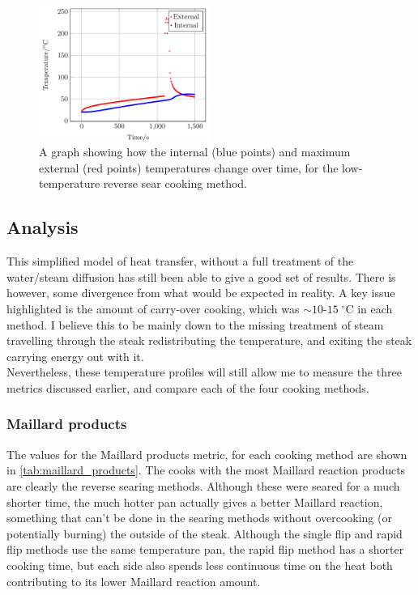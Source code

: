 \documentclass[11pt]{article}
\begin{document}
	\begin{figure}[H]
		\centering
		\includegraphics[width=0.5\textwidth]{./img/temps-low-reverse.png}
		\caption{A graph showing how the internal (blue points) and maximum external (red points) temperatures change over time, for the low-temperature reverse sear cooking method.}
		\label{fig:low-reverse-sear-temps}
	\end{figure}
	
	\subsection{Analysis}
	
	This simplified model of heat transfer, without a full treatment of the water/steam diffusion has still been able to give a good set of results. There is however, some divergence from what would be expected in reality. A key issue highlighted is the amount of carry-over cooking, which was $\sim 10\text{-}15\;^\circ\text{C}$ in each method. I believe this to be mainly down to the missing treatment of steam travelling through the steak redistributing the temperature, and exiting the steak carrying energy out with it. \\
	
	Nevertheless, these temperature profiles will still allow me to measure the three metrics discussed earlier, and compare each of the four cooking methods.
	
	\subsubsection{Maillard products}
	
	The values for the Maillard products metric, for each cooking method are shown in \autoref{tab:maillard_products}. The cooks with the most Maillard reaction products are clearly the reverse searing methods. Although these were seared for a much shorter time, the much hotter pan actually gives a better Maillard reaction, something that can't be done in the searing methods without overcooking (or potentially burning) the outside of the steak. Although the single flip and rapid flip methods use the same temperature pan, the rapid flip method has a shorter cooking time, but each side also spends less continuous time on the heat both contributing to its lower Maillard reaction amount.
	
\end{document}

